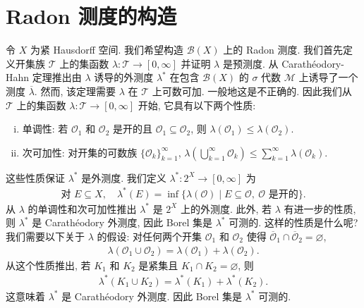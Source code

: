 \documentclass[../../main.tex]{subfiles}
\begin{document}
\section{Radon 测度的构造}\label{section:ch21-radon构造}

令 $X$ 为紧 Hausdorff 空间. 我们希望构造 $\mathcal{B}(X)$ 上的 Radon 测度. 我们首先定义开集族 $\mathcal{T}$ 上的集函数 $\lambda:\mathcal{T}\to[0,\infty]$ 并证明 $\lambda$ 是预测度. 从 Carath\'eodory-Hahn 定理推出由 $\lambda$ 诱导的外测度 $\lambda^{*}$ 在包含 $\mathcal{B}(X)$ 的 $\sigma$ 代数 $\mathcal{M}$ 上诱导了一个测度 $\overline{\lambda}$. 然而, 该定理需要 $\lambda$ 在 $\mathcal{T}$ 上可数可加. 一般地这是不正确的. 因此我们从 $\mathcal{T}$ 上的集函数 $\lambda:\mathcal{T}\to[0,\infty]$ 开始, 它具有以下两个性质:
\begin{enumerate}[(i)]
\item 单调性: 若 $\mathcal{O}_{1}$ 和 $\mathcal{O}_{2}$ 是开的且 $\mathcal{O}_{1}\subseteq\mathcal{O}_{2}$, 则 $\lambda(\mathcal{O}_{1})\leqslant\lambda(\mathcal{O}_{2})$.
\item 次可加性: 对开集的可数族 $\{\mathcal{O}_{k}\}_{k=1}^{\infty}$, $\lambda\left(\bigcup_{k=1}^{\infty}\mathcal{O}_{k}\right)\leqslant\sum_{k=1}^{\infty}\lambda(\mathcal{O}_{k})$.
\end{enumerate}

这些性质保证 $\lambda^{*}$ 是外测度. 我们定义 $\lambda^{*}:2^{X}\to[0,\infty]$ 为
\begin{align*}
\text{对 }E\subseteq X,\quad\lambda^{*}(E)=\inf\{\lambda(\mathcal{O})\mid E\subseteq\mathcal{O},\ \mathcal{O}\text{ 是开的}\}.
\end{align*}
从 $\lambda$ 的单调性和次可加性推出 $\lambda^{*}$ 是 $2^{X}$ 上的外测度. 此外, 若 $\lambda$ 有进一步的性质, 则 $\lambda^{*}$ 是 Carath\'eodory 外测度, 因此 Borel 集是 $\lambda^{*}$ 可测的. 这样的性质是什么呢? 我们需要以下关于 $\lambda$ 的假设: 对任何两个开集 $\mathcal{O}_{1}$ 和 $\mathcal{O}_{2}$ 使得 $\overline{\mathcal{O}}_{1}\cap\overline{\mathcal{O}}_{2}=\varnothing$,
\begin{align}\label{align:ch21-不交开集可加}
\lambda(\mathcal{O}_{1}\cup\mathcal{O}_{2})=\lambda(\mathcal{O}_{1})+\lambda(\mathcal{O}_{2}).
\end{align}
从这个性质推出, 若 $K_{1}$ 和 $K_{2}$ 是紧集且 $K_{1}\cap K_{2}=\varnothing$, 则
\begin{align*}
\lambda^{*}(K_{1}\cup K_{2})=\lambda^{*}(K_{1})+\lambda^{*}(K_{2}).
\end{align*}
这意味着 $\lambda^{*}$ 是 Carath\'eodory 外测度. 因此 Borel 集是 $\lambda^{*}$ 可测的.
\end{document}
